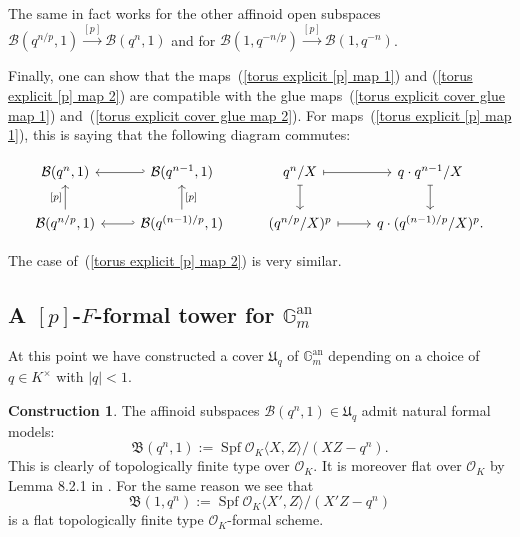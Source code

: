 \documentclass[10pt,oneside]{amsart}
\theoremstyle{definition}
\newtheorem{construction}[theorem]{Construction}
\begin{document}
	The same in fact works for the other affinoid open subspaces $\mathcal B(q^{n/p},1)\xrightarrow{[p]} \mathcal B(q^{n},1)$ and for $\mathcal B(1,q^{-n/p})\xrightarrow{[p]} \mathcal B(1,q^{-n})$.
	
	Finally, one can show that the maps~(\ref{torus explicit [p] map 1}) and (\ref{torus explicit [p] map 2}) are compatible with the glue maps~(\ref{torus explicit cover glue map 1}) and~(\ref{torus explicit cover glue map 2}). %
For maps~(\ref{torus explicit [p] map 1}), this is saying that the following diagram commutes:
	\begin{center}
		\begin{equation}\label{diagram showing that [p]-multiplication on torus glues together}
		\begin{tikzcd}
			\mathcal B(q^{n},1) & \mathcal B(q^{n-1},1) \arrow[l, hook'] & q^n/X \arrow[r, maps to] \arrow[d, maps to] & q\cdot q^{n-1}/X \arrow[d, maps to] \\
			\mathcal B(q^{n/p},1) \arrow[u, "{[p]}"] & \mathcal B(q^{(n-1)/p},1) \arrow[u, "{[p]}"'] \arrow[l, hook'] & (q^{n/p}/X)^p \arrow[r, maps to] & q\cdot(q^{(n-1)/p}/X)^p. 
		\end{tikzcd}
		\end{equation}
	\end{center} 
	The case of~(\ref{torus explicit [p] map 2}) is very similar.
	
\subsection{A $[p]$-$F$-formal tower for $\mathbb{G}^{\text{an}}_m$}
	At this point we have constructed a cover $\mathfrak U_q$ of $\mathbb G_m^{\operatorname{an}}$ depending on a choice of $q\in K^\times$ with $|q|<1$.  
	
\begin{construction}	
	The affinoid subspaces $\mathcal B(q^n,1) \in \mathfrak U_q$  admit natural formal models: 
		\[ 	\mathfrak B(q^n,1) :=   \operatorname{Spf} \mathcal O_K\langle X,Z\rangle/(XZ-q^n).\]
	This is clearly of topologically finite type over $\mathcal O_K$. It is moreover flat over $\mathcal O_K$ by Lemma 8.2.1 in \cite{Bosch lectures}. For the same reason  we see that
	        \[ \mathfrak B(1,q^n) := \operatorname{Spf} \mathcal O_K\langle X',Z\rangle/(X'Z-q^n)\] is a flat topologically finite type $\mathcal O_K$-formal scheme. 
\end{construction}
\end{document}
